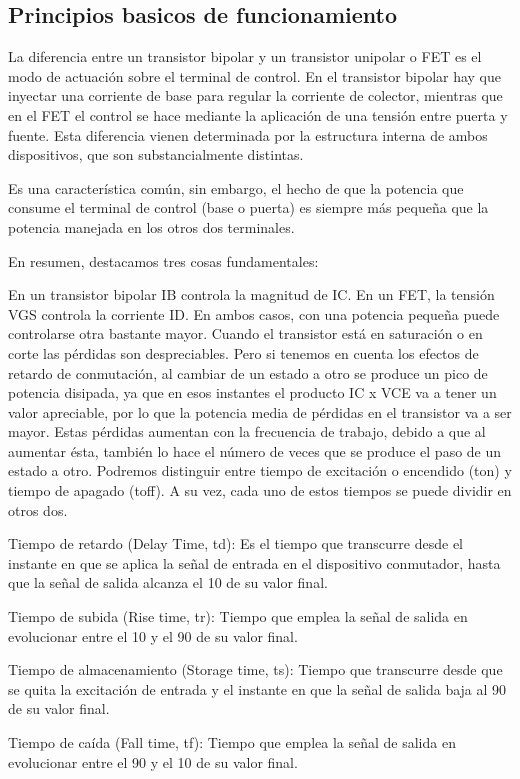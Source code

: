 \documentclass[12pt,a4paper]{article}
\begin{document}
\subsection{Principios basicos de funcionamiento}
La diferencia entre un transistor bipolar y un transistor unipolar o FET es el modo de actuación sobre el terminal de control. En el transistor bipolar hay que inyectar una corriente de base para regular la corriente de colector, mientras que en el FET el control se hace mediante la aplicación de una tensión entre puerta y fuente. Esta diferencia vienen determinada por la estructura interna de ambos dispositivos, que son substancialmente distintas.

Es una característica común, sin embargo, el hecho de que la potencia que consume el terminal de control (base o puerta) es siempre más pequeña que la potencia manejada en los otros dos terminales.

En resumen, destacamos tres cosas fundamentales:

En un transistor bipolar IB controla la magnitud de IC.
En un FET, la tensión VGS controla la corriente ID.
En ambos casos, con una potencia pequeña puede controlarse otra bastante mayor.
Cuando el transistor está en saturación o en corte las pérdidas son despreciables. Pero si tenemos en cuenta los efectos de retardo de conmutación, al cambiar de un estado a otro se produce un pico de potencia disipada, ya que en esos instantes el producto IC x VCE va a tener un valor apreciable, por lo que la potencia media de pérdidas en el transistor va a ser mayor. Estas pérdidas aumentan con la frecuencia de trabajo, debido a que al aumentar ésta, también lo hace el número de veces que se produce el paso de un estado a otro.
Podremos distinguir entre tiempo de excitación o encendido (ton) y tiempo de apagado (toff). A su vez, cada uno de estos tiempos se puede dividir en otros dos.

Tiempo de retardo (Delay Time, td): Es el tiempo que transcurre desde el instante en que se aplica la señal de entrada en el dispositivo conmutador, hasta que la señal de salida alcanza el 10 de su valor final.

Tiempo de subida (Rise time, tr): Tiempo que emplea la señal de salida en evolucionar entre el 10 y el 90 de su valor final.

Tiempo de almacenamiento (Storage time, ts): Tiempo que transcurre desde que se quita la excitación de entrada y el instante en que la señal de salida baja al 90 de su valor final.

Tiempo de caída (Fall time, tf): Tiempo que emplea la señal de salida en evolucionar entre el 90 y el 10 de su valor final.
\end{document}
